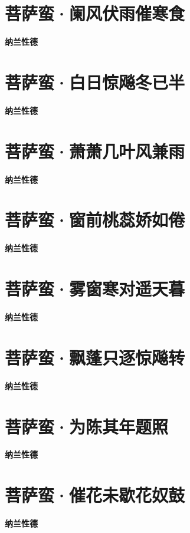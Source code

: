 \documentclass[12pt,a4paper]{ctexbook}
\begin{document}
\section{菩萨蛮·阑风伏雨催寒食}
\textbf{纳兰性德}\par\vspace{0.5em}

\section{菩萨蛮·白日惊飚冬已半}
\textbf{纳兰性德}\par\vspace{0.5em}

\section{菩萨蛮·萧萧几叶风兼雨}
\textbf{纳兰性德}\par\vspace{0.5em}

\section{菩萨蛮·窗前桃蕊娇如倦}
\textbf{纳兰性德}\par\vspace{0.5em}

\section{菩萨蛮·雾窗寒对遥天暮}
\textbf{纳兰性德}\par\vspace{0.5em}

\section{菩萨蛮·飘蓬只逐惊飚转}
\textbf{纳兰性德}\par\vspace{0.5em}

\section{菩萨蛮·为陈其年题照}
\textbf{纳兰性德}\par\vspace{0.5em}

\section{菩萨蛮·催花未歇花奴鼓}
\textbf{纳兰性德}\par\vspace{0.5em}
\end{document}
